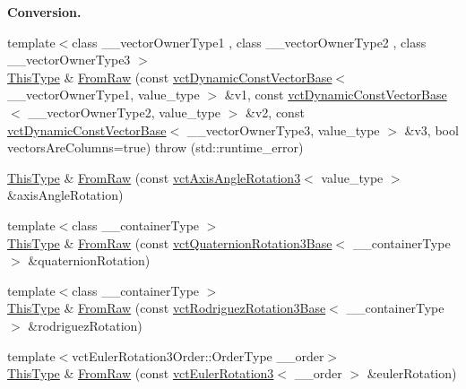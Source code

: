 \begin{Indent}{\bf Conversion.}
\begin{DoxyCompactItemize}
\item 
{\footnotesize template$<$class \-\_\-\-\_\-vector\-Owner\-Type1 , class \-\_\-\-\_\-vector\-Owner\-Type2 , class \-\_\-\-\_\-vector\-Owner\-Type3 $>$ }\\\hyperlink{classvct_matrix_rotation3_base_a027be766cb10ca3c2ad8e85c28ed0af9}{This\-Type} \& \hyperlink{classvct_matrix_rotation3_base_a3b404a43a50e4fb778d52e0ef206d4ef}{From\-Raw} (const \hyperlink{classvct_dynamic_const_vector_base}{vct\-Dynamic\-Const\-Vector\-Base}$<$ \-\_\-\-\_\-vector\-Owner\-Type1, value\-\_\-type $>$ \&v1, const \hyperlink{classvct_dynamic_const_vector_base}{vct\-Dynamic\-Const\-Vector\-Base}$<$ \-\_\-\-\_\-vector\-Owner\-Type2, value\-\_\-type $>$ \&v2, const \hyperlink{classvct_dynamic_const_vector_base}{vct\-Dynamic\-Const\-Vector\-Base}$<$ \-\_\-\-\_\-vector\-Owner\-Type3, value\-\_\-type $>$ \&v3, bool vectors\-Are\-Columns=true)  throw (std\-::runtime\-\_\-error)
\item 
\hyperlink{classvct_matrix_rotation3_base_a027be766cb10ca3c2ad8e85c28ed0af9}{This\-Type} \& \hyperlink{classvct_matrix_rotation3_base_a4ec32e08d3dd30c552bf163f2332eff2}{From\-Raw} (const \hyperlink{classvct_axis_angle_rotation3}{vct\-Axis\-Angle\-Rotation3}$<$ value\-\_\-type $>$ \&axis\-Angle\-Rotation)
\item 
{\footnotesize template$<$class \-\_\-\-\_\-container\-Type $>$ }\\\hyperlink{classvct_matrix_rotation3_base_a027be766cb10ca3c2ad8e85c28ed0af9}{This\-Type} \& \hyperlink{classvct_matrix_rotation3_base_a1d67c2b62eb53457d65b2ac0a389b500}{From\-Raw} (const \hyperlink{classvct_quaternion_rotation3_base}{vct\-Quaternion\-Rotation3\-Base}$<$ \-\_\-\-\_\-container\-Type $>$ \&quaternion\-Rotation)
\item 
{\footnotesize template$<$class \-\_\-\-\_\-container\-Type $>$ }\\\hyperlink{classvct_matrix_rotation3_base_a027be766cb10ca3c2ad8e85c28ed0af9}{This\-Type} \& \hyperlink{classvct_matrix_rotation3_base_aca9b540ee54484b458de4e0b3d9f731b}{From\-Raw} (const \hyperlink{classvct_rodriguez_rotation3_base}{vct\-Rodriguez\-Rotation3\-Base}$<$ \-\_\-\-\_\-container\-Type $>$ \&rodriguez\-Rotation)
\item 
{\footnotesize template$<$vct\-Euler\-Rotation3\-Order\-::\-Order\-Type \-\_\-\-\_\-order$>$ }\\\hyperlink{classvct_matrix_rotation3_base_a027be766cb10ca3c2ad8e85c28ed0af9}{This\-Type} \& \hyperlink{classvct_matrix_rotation3_base_a1429dd190f5b891a39827e1da8495033}{From\-Raw} (const \hyperlink{classvct_euler_rotation3}{vct\-Euler\-Rotation3}$<$ \-\_\-\-\_\-order $>$ \&euler\-Rotation)

\end{DoxyCompactItemize}
\end{Indent}
